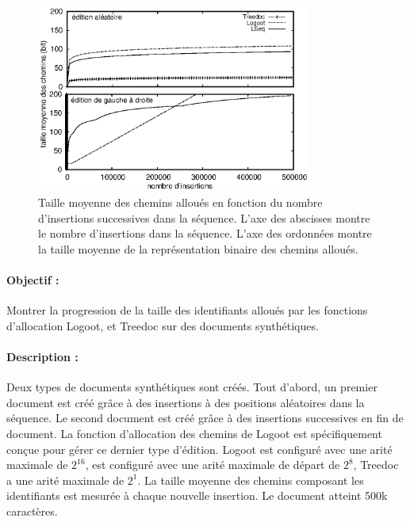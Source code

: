 \begin{figure}
  \begin{center}
    \includegraphics[width=0.8\textwidth]{img/lseq/space.eps}
    \caption[Taille moyenne des chemins sur des documents synthétiques]
    {\label{repl:img:motivationartificial}Taille moyenne des chemins alloués en
      fonction du nombre d'insertions successives dans la séquence. L'axe des
      abscisses montre le nombre d'insertions dans la séquence. L'axe des
      ordonnées montre la taille moyenne de la représentation binaire des
      chemins alloués.}
  \end{center}
\end{figure}

\paragraph{Objectif :} Montrer la progression de la taille des identifiants
alloués par les fonctions d'allocation Logoot, \LSEQ et Treedoc sur des
documents synthétiques.

\paragraph{Description :} Deux types de documents synthétiques sont créés. Tout
d'abord, un premier document est créé grâce à des insertions à des positions
aléatoires dans la séquence. Le second document est créé grâce à des insertions
successives en fin de document. La fonction d'allocation des chemins de Logoot
est spécifiquement conçue pour gérer ce dernier type d'édition. Logoot est
configuré avec une arité maximale de $2^{16}$, \LSEQ est configuré avec une
arité maximale de départ de $2^8$, Treedoc a une arité maximale de $2^1$.  La
taille moyenne des chemins composant les identifiants est mesurée à chaque
nouvelle insertion. Le document atteint 500k caractères.

